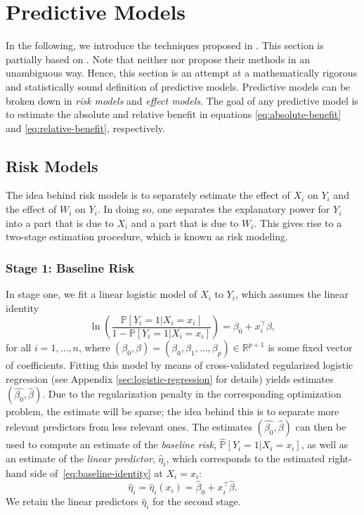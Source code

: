 \documentclass[11pt]{article}
\renewcommand{\P}{\mathbb{P}}
\newcommand{\R}{\mathbb{R}}
\begin{document}
\section{Predictive Models}
In the following, we introduce the techniques proposed in \cite{kent2020path}. This section is partially based on \cite{rekkas2019}. Note that neither \cite{kent2020path} nor \cite{rekkas2019} propose their methods in an unambiguous way. Hence, this section is an attempt at a mathematically rigorous and statistically sound definition of predictive models. Predictive models can be broken down in \textit{risk models} and \textit{effect models}. The goal of any predictive model is to estimate the absolute and relative benefit in equations \eqref{eq:absolute-benefit} and \eqref{eq:relative-benefit}, respectively.

\subsection{Risk Models}\label{sec:risk-model}
The idea behind risk models is to separately estimate the effect of $X_i$ on $Y_i$ and the effect of $W_i$ on $Y_i$. In doing so, one separates the explanatory power for $Y_i$ into a part that is due to $X_i$ and a part that is due to $W_i$. This gives rise to a two-stage estimation procedure, which is known as risk modeling.

\subsubsection{Stage 1: Baseline Risk} \label{sec:baseline-risk}
In stage one, we fit a linear logistic model of $X_i$ to $Y_i$, which assumes the linear identity
\begin{equation} \label{eq:baseline-identity}
    \ln \left( \frac{ \P[Y_i=1 | X_i = x_i] }{1 - \P[Y_i=1 | X_i = x_i]} \right)
    =
    \beta_0 + x_i^\top \beta, 
\end{equation}
for all $i=1,\dots,n$, where $(\beta_0, \beta) = (\beta_0,\beta_1,\dots,\beta_p)\in\R^{p+1}$ is some fixed vector of coefficients. Fitting this model by means of cross-validated regularized logistic regression (see Appendix \ref{sec:logistic-regression} for details) yields estimates $(\widehat{\beta_0}, \widehat{\beta})$. Due to the regularization penalty in the corresponding optimization problem, the estimate will be sparse; the idea behind this is to separate more relevant predictors from less relevant ones.  
The estimates $(\widehat{\beta_0}, \widehat{\beta})$ can then be used to compute an estimate of the \textit{baseline risk}, $\widehat{\P}[Y_i=1 | X_i = x_i]$, as well as an estimate of the \textit{linear predictor}, $\widehat{\eta}_i$, which corresponds to the estimated right-hand side of~\eqref{eq:baseline-identity} at $X_i = x_i$:
\begin{equation*}
    \widehat{\eta}_i = \widehat{\eta}_i(x_i) = \widehat{\beta}_0 + x_i^\top \widehat{\beta}.
\end{equation*}
We retain the linear predictors $\widehat{\eta}_i$ for the second stage.
\end{document}
